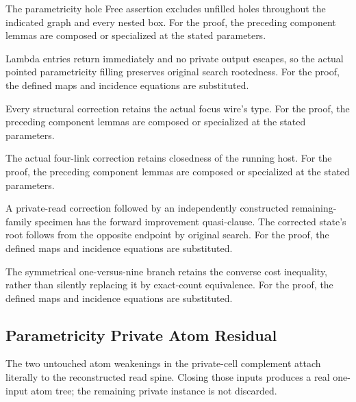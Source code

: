 The parametricity hole Free assertion excludes unfilled holes throughout the indicated graph and every nested box.
For the proof, the preceding component lemmas are composed or specialized at the stated parameters.
\par{}

Lambda entries return immediately and no private output escapes, so the actual pointed parametricity filling preserves original search rootedness.
For the proof, the defined maps and incidence equations are substituted.
\par{}

Every structural correction retains the actual focus wire's type.
For the proof, the preceding component lemmas are composed or specialized at the stated parameters.
\par{}

The actual four-link correction retains closedness of the running host.
For the proof, the preceding component lemmas are composed or specialized at the stated parameters.
\par{}

A private-read correction followed by an independently constructed remaining-family specimen has the forward improvement quasi-clause. The corrected state's root follows from the opposite endpoint by original search.
For the proof, the defined maps and incidence equations are substituted.
\par{}

The symmetrical one-versus-nine branch retains the converse cost inequality, rather than silently replacing it by exact-count equivalence.
For the proof, the defined maps and incidence equations are substituted.
\par{}

\subsection{Parametricity Private Atom Residual}
The two untouched atom weakenings in the private-cell complement attach literally to the reconstructed read spine. Closing those inputs produces a real one-input atom tree; the remaining private instance is not discarded.

